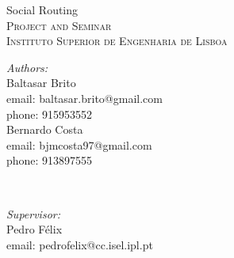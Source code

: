 \documentclass{article}
\begin{document}
    
    \begin{titlepage}
        \center
    
        {\Huge Social Routing}\\[0.5cm]    
        \textsc{\Large Project and Seminar}\\[0.5cm]
        \textsc{\large Instituto Superior de Engenharia de Lisboa}\\[0.5cm]
      

        \begin{minipage}{0.4\textwidth}
            \begin{flushleft} \large
            \emph{Authors:}\\
            Baltasar Brito\\
            {\small email: baltasar.brito@gmail.com}\\
            {\small phone: 915953552}\\
            Bernardo Costa\\
            {\small email: bjmcosta97@gmail.com}\\
            {\small phone: 913897555}\\
            \end{flushleft}
        \end{minipage}
        ~
        \begin{minipage}{0.4\textwidth}
        \begin{flushright} \large
        \emph{Supervisor:} \\ 
        Pedro Félix\\
        {\small email: pedrofelix@cc.isel.ipl.pt}\\  
        \end{flushright}
        \end{minipage}\\[2cm]

    \end{titlepage}
\end{document}
